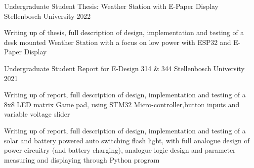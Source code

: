 

\begin{cventries}

  \cventry
    {Undergraduate Student} %
    {Thesis: Weather Station with E-Paper Display} %
    {Stellenbosch University} %
    {2022} %
    {
      \begin{cvitems} %
        \item {Writing up of thesis, full description of design, implementation and testing of a desk mounted Weather Station with a focus on low power with ESP32 and E-Paper Display}
      \end{cvitems}
    }

  \cventry
    {Undergraduate Student} %
    {Report for E-Design 314 \& 344} %
    {Stellenbosch University} %
    {2021} %
    {
      \begin{cvitems} %
        \item {Writing up of report, full description of design, implementation and testing of a 8x8 LED matrix Game pad, using STM32 Micro-controller,button inputs and variable voltage slider}
        \item {Writing up of report, full description of design, implementation and testing of a solar and battery powered auto switching flash light, with full analogue design of power circuitry (and battery charging), analogue logic design and parameter measuring and displaying through Python program}
      \end{cvitems}
    }

\end{cventries}
